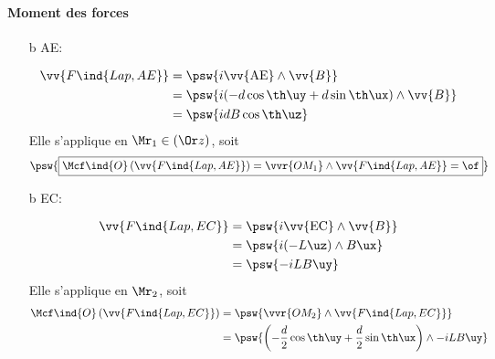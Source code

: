 \documentclass[../../main/main.tex]{subfiles}
\begin{document}
\begin{tcb*}[breakable]
	\paragraph*{Moment des forces}
	\begin{itemize}
		\item[b]{AE}:~
		\smallbreak
		\vspace{-25pt}
		\begin{isd}[interior hidden, sidebyside align=top]
			\begin{align*}
				\vv{F\ind{Lap,AE}}
				 & =
				\psw{i \vv{\rm AE}\wedge \vv{B}}
				\\
				 & = \psw{i (-d \cos{\th}\uy + d\sin{\th}\ux)\wedge \vv{B}}
				\\
				 & = \psw{idB\cos{\th}\uz}
			\end{align*}
			\tcblower
			Elle s'applique en $\Mr_1 \in (\Or z)$, soit
			\[
				\psw{%
					\boxed{\Mcf\ind{O} \left( \vv{F\ind{Lap,AE}} \right) =
						\vvr{OM_1}\wedge \vv{F\ind{Lap,AE}}
						= \of}
				}%
			\]
		\end{isd}
		\item[b]{EC}:~
		\smallbreak
		\vspace{-25pt}
		\begin{isd}[interior hidden, sidebyside align=top, lefthand ratio=.3]
			\begin{align*}
				\vv{F\ind{Lap,EC}}
				 & = \psw{i \vv{\rm EC}\wedge \vv{B}}
				\\
				 & = \psw{i (-L\uz)\wedge B\ux}
				\\
				 & = \psw{-iLB\uy}
			\end{align*}
			\tcblower
			Elle s'applique en $\Mr_2$, soit
			\begin{align*}
				\Mcf\ind{O} \left( \vv{F\ind{Lap,EC}} \right)
				 & = \psw{\vvr{OM_2}\wedge \vv{F\ind{Lap,EC}}}
				\\
				 & =
				\psw{%
					\left(
					-\frac{d}{2}\cos{\th}\uy +
					\frac{d}{2}\sin{\th}\ux
					\right)\wedge -iLB\uy
}
\end{align*}
\end{isd}
\end{itemize}
\end{tcb*}
\end{document}
